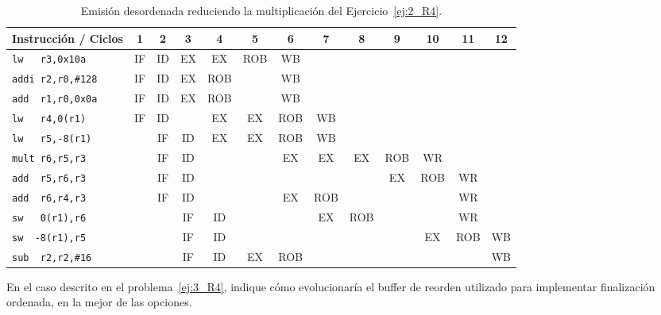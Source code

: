 \begin{ejercicio}
    \begin{table}
        \centering
        \scriptsize
        \begin{tabular}{|l|c|c|c|c|c|c|c|c|c|c|c|c|}
            \hline
            Instrucción / Ciclos & 1 & 2 & 3 & 4 & 5 & 6 & 7 & 8 & 9 & 10 & 11 & 12 \\
            \hline
            \verb|lw   r3,0x10a|        & IF & ID & EX & EX & ROB & WB & & & & & &\\
            \hline        
            \verb|addi r2,r0,#128|      & IF & ID & EX & ROB & & WB & & & & & &\\
            \hline           
            \verb|add  r1,r0,0x0a|      & IF & ID & EX & ROB & &  WB & & & & & & \\
            \hline                        
            \verb|lw   r4,0(r1)|        & IF & ID & & EX & EX & ROB & WB & & & & & \\
            \hline            
            \verb|lw   r5,-8(r1)|       & & IF & ID & EX & EX & ROB & WB & & & && \\
            \hline
            \verb|mult r6,r5,r3|        & & IF & ID & & & EX & EX & EX & ROB & WR & & \\
            \hline
            \verb|add  r5,r6,r3|        & & IF & ID & & & & & & EX & ROB & WR & \\
            \hline
            \verb|add  r6,r4,r3|        & & IF & ID & & & EX & ROB & & & & WR &\\
            \hline            
            \verb|sw   0(r1),r6|        & & & IF & ID & & & EX & ROB & & & WR & \\
            \hline
            \verb|sw  -8(r1),r5|        & & & IF & ID & & & & & & EX & ROB & WB\\
            \hline
            \verb|sub  r2,r2,#16|       & & & IF & ID & EX & ROB & & & & & & WB \\
            \hline
        \end{tabular}
        \caption{Emisión desordenada reduciendo la multiplicación del Ejercicio~\ref{ej:2_R4}.}
        \label{tab:ej3_R4_2}
    \end{table}
\end{ejercicio}

\begin{ejercicio}
    En el caso descrito en el problema~\ref{ej:3_R4}, indique cómo evolucionaría el buffer de reorden utilizado para implementar finalización ordenada, en la mejor de las opciones. 
\end{ejercicio}

